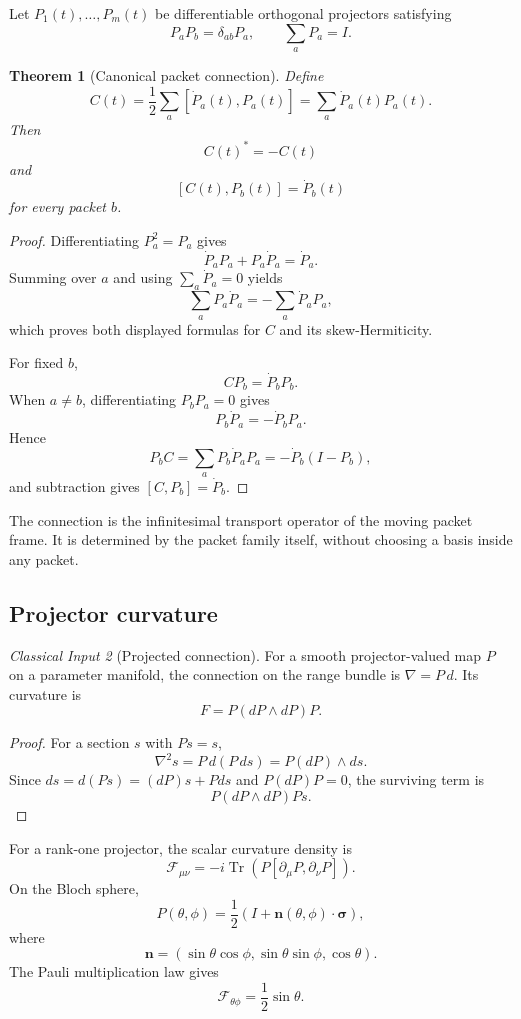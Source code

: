\documentclass[11pt]{article}
\newtheorem{theorem}{Theorem}[section]
\theoremstyle{definition}
\theoremstyle{remark}
\newtheorem{classical}[theorem]{Classical Input}
\newcommand{\cF}{\mathcal F}
\newcommand{\Tr}{\operatorname{Tr}}
\begin{document}
Let $P_1(t),\ldots,P_m(t)$ be differentiable orthogonal projectors satisfying
\[
P_aP_b=\delta_{ab}P_a,
\qquad
\sum_aP_a=I.
\]

\begin{theorem}[Canonical packet connection]
Define
\[
\boxed{
C(t)
=
\frac12\sum_a[\dot P_a(t),P_a(t)]
=
\sum_a\dot P_a(t)P_a(t).
}
\]
Then
\[
C(t)^*=-C(t)
\]
and
\[
\boxed{
[C(t),P_b(t)]=\dot P_b(t)
}
\]
for every packet $b$.
\end{theorem}

\begin{proof}
Differentiating $P_a^2=P_a$ gives
\[
\dot P_aP_a+P_a\dot P_a=\dot P_a.
\]
Summing over $a$ and using $\sum_a\dot P_a=0$ yields
\[
\sum_aP_a\dot P_a=-\sum_a\dot P_aP_a,
\]
which proves both displayed formulas for $C$ and its skew-Hermiticity.

For fixed $b$,
\[
CP_b=\dot P_bP_b.
\]
When $a\ne b$, differentiating $P_bP_a=0$ gives
\[
P_b\dot P_a=-\dot P_bP_a.
\]
Hence
\[
P_bC
=\sum_aP_b\dot P_aP_a
=-\dot P_b(I-P_b),
\]
and subtraction gives $[C,P_b]=\dot P_b$.
\end{proof}

The connection is the infinitesimal transport operator of the moving packet frame. It is determined by the packet family itself, without choosing a basis inside any packet.

\subsection{Projector curvature}

\begin{classical}[Projected connection]
For a smooth projector-valued map $P$ on a parameter manifold, the connection on the range bundle is $\nabla=P\,d$. Its curvature is
\[
\boxed{
F=P(dP\wedge dP)P.
}
\]
\end{classical}

\begin{proof}
For a section $s$ with $Ps=s$,
\[
\nabla^2s
=P\,d(P\,ds)
=P(dP)\wedge ds.
\]
Since $ds=d(Ps)=(dP)s+Pds$ and $P(dP)P=0$, the surviving term is
\[
P(dP\wedge dP)Ps.
\]
\end{proof}

For a rank-one projector, the scalar curvature density is
\[
\cF_{\mu\nu}
=-i\Tr\left(P[\partial_\mu P,\partial_\nu P]\right).
\]
On the Bloch sphere,
\[
P(\theta,\phi)
=
\frac12\left(I+\mathbf n(\theta,\phi)\cdot\boldsymbol\sigma\right),
\]
where
\[
\mathbf n=(\sin\theta\cos\phi,\sin\theta\sin\phi,\cos\theta).
\]
The Pauli multiplication law gives
\[
\boxed{
\cF_{\theta\phi}
=\frac12\sin\theta.
}
\]
\end{document}
